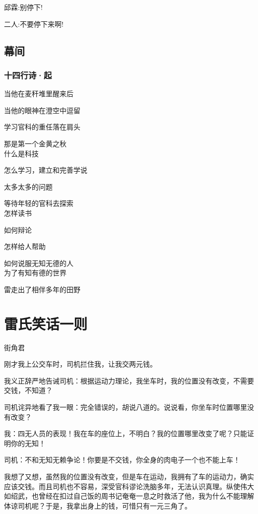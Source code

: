 \documentclass[UTF8,12pt,oneside]{ctexbook}
\begin{document}
    邱霖:别停下!
    
    二人:不要停下来啊!
    
    \subsection{幕间}
    \subsubsection{十四行诗·起}
    
    当他在麦秆堆里醒来后
    
    当他的眼神在澄空中逗留
    
    学习官科的重任落在肩头
    
    那是第一个金黄之秋
    ~\\
    
    什么是科技
    
    怎么学习，建立和完善学说
    
    太多太多的问题
    
    等待年轻的官科去探索
    ~\\
    
    怎样读书
    
    如何辩论
    
    怎样给人帮助
    
    如何说服无知无德的人
    ~\\
    
    为了有知有德的世界
    
    雷走出了相伴多年的田野

\newpage

\section{雷氏笑话一则}
\begin{center}
    街角君
\end{center}

刚才我上公交车时，司机拦住我，让我交两元钱。

我义正辞严地告诫司机：根据运动力理论，我坐车时，我的位置没有改变，不需要交钱，不知道？

司机诧异地看了我一眼：完全错误的，胡说八道的。说说看，你坐车时位置哪里没有改变？ 

我：四无人员的表现！我在车的座位上，不明白？我的位置哪里改变了呢？只能证明你的无知！

司机：不和无知无赖争论！你要是不交钱，你全身的肉电子一个也不能上车！ 

我想了又想，虽然我的位置没有改变，但是车在运动，我拥有了车的运动力，确实应该交钱。而且司机也不容易，深受官科谬论洗脑多年，无法认识真理。纵使伟大如绍武，也曾经在扣过自己饭的周书记奄奄一息之时救活了他，我为什么不能理解体谅司机呢？于是，我拿出身上的钱，可惜只有一元三角了。
\end{document}
